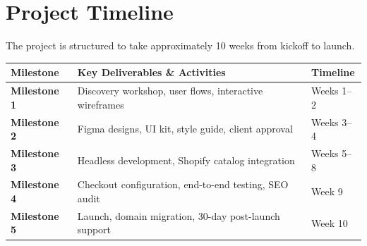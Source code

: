 \section{Project Timeline}
The project is structured to take approximately 10 weeks from kickoff to launch.

\parbreak
\begin{tabularx}{\linewidth}{l X l}
\toprule
\rowcolor{neutrallight} \textbf{Milestone} & \textbf{Key Deliverables \& Activities} & \textbf{Timeline} \\
\midrule
\textbf{Milestone 1} & Discovery workshop, user flows, interactive wireframes & Weeks 1--2 \\
\textbf{Milestone 2} & Figma designs, UI kit, style guide, client approval & Weeks 3--4 \\
\textbf{Milestone 3} & Headless development, Shopify catalog integration & Weeks 5--8 \\
\textbf{Milestone 4} & Checkout configuration, end-to-end testing, SEO audit & Week 9 \\
\textbf{Milestone 5} & Launch, domain migration, 30-day post-launch support & Week 10 \\
\bottomrule
\end{tabularx}

\vspace{0.05in}

